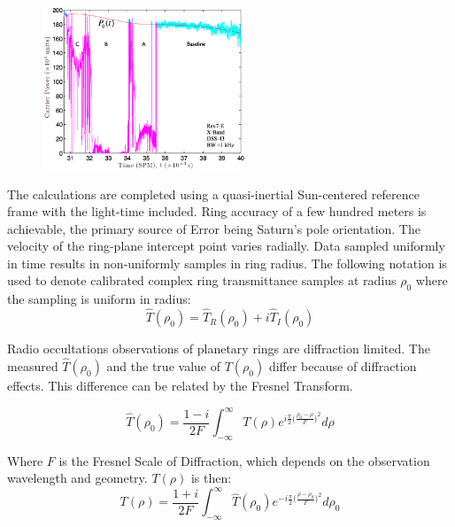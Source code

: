 \documentclass{article}
\theoremstyle{mystyle}
\begin{document}
\begin{figure}
	\begin{center}
	\includegraphics[width = 0.54\textwidth]{USER_9}
	\end{center}
\end{figure}

\noindent The calculations are completed using a quasi-inertial Sun-centered reference frame with the light-time included. Ring accuracy of a few hundred meters is achievable, the primary source of Error being Saturn's pole orientation. The velocity of the ring-plane intercept point varies radially. Data sampled uniformly in time results in non-uniformly samples in ring radius. The following notation is used to denote calibrated complex ring transmittance samples at radius $\rho_0$ where the sampling is uniform in radius:
\begin{equation}
\hat{T}(\rho_0) = \hat{T}_{R}(\rho_0)+i\hat{T}_{I}(\rho_0)
\end{equation}

\noindent Radio occultations observations of planetary rings are diffraction limited. The measured $\hat{T}(\rho_0)$ and the true value of $T(\rho_0)$ differ because of diffraction effects. This difference can be related by the Fresnel Transform.

\begin{equation}
\hat{T}(\rho_0) = \frac{1-i}{2F}\int_{-\infty}^{\infty} T(\rho)e^{i\frac{\pi}{2}\big(\frac{\rho_0-\rho}{F}\big)^2}d\rho
\end{equation}

\noindent Where $F$ is the Fresnel Scale of Diffraction, which depends on the observation wavelength and geometry. $T(\rho)$ is then:
\begin{equation}
T(\rho) = \frac{1+i}{2F}\int_{-\infty}^{\infty}\hat{T}(\rho_0)e^{-i\frac{\pi}{2}\big(\frac{\rho-\rho_0}{F}\big)^2}d\rho_{0}
\end{equation}
\end{document}
